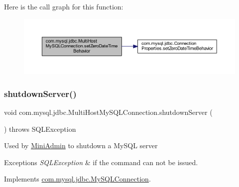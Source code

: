 Here is the call graph for this function\+:
\nopagebreak
\begin{figure}[H]
\begin{center}
\leavevmode
\includegraphics[width=350pt]{classcom_1_1mysql_1_1jdbc_1_1_multi_host_my_s_q_l_connection_a236306cd02b385607ef0b443508b4f89_cgraph}
\end{center}
\end{figure}
\mbox{\label{classcom_1_1mysql_1_1jdbc_1_1_multi_host_my_s_q_l_connection_a84e14d759493436465fa6bf6160e5153}} 
\subsubsection{\texorpdfstring{shutdown\+Server()}{shutdownServer()}}
{\footnotesize\ttfamily void com.\+mysql.\+jdbc.\+Multi\+Host\+My\+S\+Q\+L\+Connection.\+shutdown\+Server (\begin{DoxyParamCaption}{ }\end{DoxyParamCaption}) throws S\+Q\+L\+Exception}

Used by \mbox{\hyperlink{classcom_1_1mysql_1_1jdbc_1_1_mini_admin}{Mini\+Admin}} to shutdown a My\+S\+QL server


\begin{DoxyExceptions}{Exceptions}
{\em S\+Q\+L\+Exception} & if the command can not be issued. \\
\hline
\end{DoxyExceptions}


Implements \mbox{\hyperlink{interfacecom_1_1mysql_1_1jdbc_1_1_my_s_q_l_connection_ab6fa367972e51a54bc186f7856568098}{com.\+mysql.\+jdbc.\+My\+S\+Q\+L\+Connection}}.


